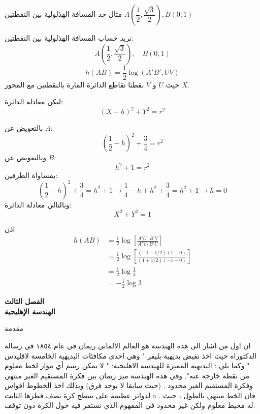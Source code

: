 		\begin{frame}
			\begin{exampleblock}{مثال}
				جد المسافة الهذلولية بين النقطتين 
				$A\left(\dfrac{1}{2}, \dfrac{\sqrt{3}}{2}\right), B(0,1)$
			\end{exampleblock}
				نريد حساب المسافة الهذلولية بين النقطتين:
				\[
				A\left(\frac{1}{2}, \frac{\sqrt{3}}{2}\right), \quad B(0,1)
				\]
				\[
				h(AB) = \frac{1}{2}\log (A'B', UV) 
				\]
				حيث $U$ و $V$ نقطتا تقاطع الدائرة المارة بالنقطتين مع المحور $X$.
				
				لتكن معادلة الدائرة:
				\[
				(X - h)^2 + Y^2 = r^2
				\]
		\end{frame}
		\begin{frame}
				
			بالتعويض عن $A$:
			\[
			\left(\frac{1}{2} - h\right)^2 + \frac{3}{4} = r^2
			\]
			وبالتعويض عن $B$:
			\[
			h^2 + 1 = r^2
			\]
			بمساواة الطرفين:
			\[
			\left(\frac{1}{2} - h\right)^2 + \frac{3}{4} = h^2 + 1 \to \frac{1}{4} - h + h^2 + \frac{3}{4} = h^2 + 1 \to h = 0
			\]
			وبالتالي معادلة الدائرة:
			\[
			X^2 + Y^2 = 1
			\]
		\end{frame}
		
		\begin{frame}
			
			اذن
			\begin{align*}
				h(AB) &= \frac{1}{2} \log\left[\frac{A'U\cdot B'V}{A'V\cdot B'U} \right]\\
				&= \frac{1}{2}\log\left[\frac{(-1-1/2)(1-0)}{(1 + 1/2)(-1-0)}\right]\\
				&=\frac{1}{2} \log \frac{1}{3}\\
				&= -\frac{1}{2} \log 3
			\end{align*}
		\end{frame}
		
		\begin{frame}
			\begin{center}
				\Huge
				\textbf{الفصل الثالث}\\
				\textbf{الهندسة الإهليجية}
			\end{center}
		\end{frame}
		
		\begin{frame}{مقدمة}
			\doublespacing
			
			ان اول من اشار الى هذه الهندسة هو العالم الالماني ريمان في عام ١٨٥٤ في رسالة الدكتوراه حيث اخذ نقيض بديهية بليفر " وهي احدى مكافئات البديهية الخامسة لاقليدس " وكما يلي :
			البديهية المميزة للهندسة الاهليجية:
			" لا يمكن رسم أي مواز لخط معلوم من نقطة خارجة عنه".
			وفي هذه الهندسة ميز ريمان بين فكرة المستقيم الغير منتهي وفكرة المستقيم الغير محدود .
			(حيث سابقا لا يوجد فرق) وبذلك اخذ الخطوط اقواس لدوائر عظيمة على سطح كرة نصف قطرها الثابت a . فان الخط منتهي بالطول ، حيث له محيط معلوم ولكن غير محدود في المفهوم الذي نستمر فيه حول الكرة دون توقف.
		\end{frame}
		
